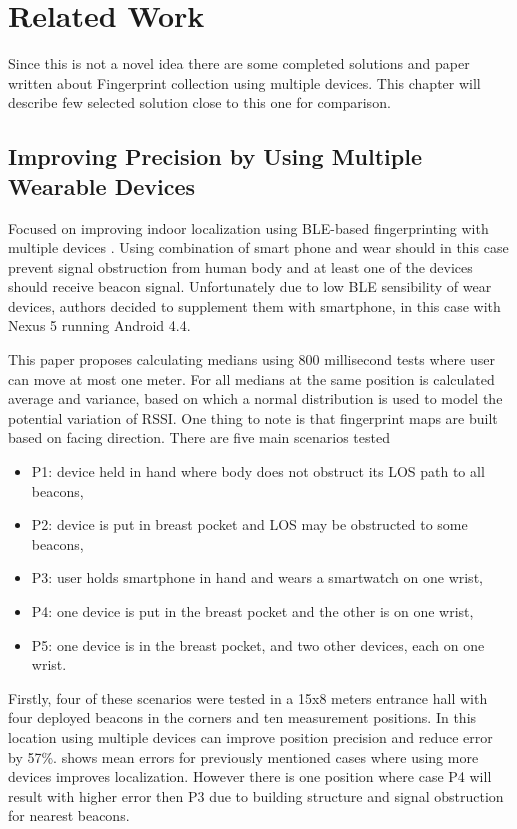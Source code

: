 \chapter{Related Work}\label{sec:RelatedWork}
Since this is not a novel idea there are some completed solutions and paper written about Fingerprint collection using multiple devices. This chapter will describe few selected solution close to this one for comparison.

\section{Improving Precision by Using Multiple Wearable Devices}\label{sec:IPUMWD}
Focused on improving indoor localization using BLE-based fingerprinting with multiple devices \cite{IPBLEIUMWD}. Using combination of smart phone and wear should in this case prevent signal obstruction from human body and at least one of the devices should receive beacon signal. Unfortunately due to low BLE sensibility of wear devices, authors decided to supplement them with smartphone, in this case with Nexus 5 running Android 4.4.

This paper proposes calculating medians using 800 millisecond tests where user can move at most one meter. For all medians at the same position is calculated average and variance, based on which a normal distribution is used to model the potential variation of RSSI. One thing to note is that fingerprint maps are built based on facing direction. There are five main scenarios tested

\begin{itemize}
	\item P1: device held in hand where body does not obstruct its LOS path to all beacons,
	\item P2: device is put in breast pocket and LOS may be obstructed to some beacons,
	\item P3: user holds smartphone in hand and wears a smartwatch on one wrist,
	\item P4: one device is put in the breast pocket and the other is on one wrist,
	\item P5: one device is in the breast pocket, and two other devices, each on one wrist.
\end{itemize} 

Firstly, four of these scenarios were tested in a 15x8 meters entrance hall with four deployed beacons in the corners and ten measurement positions. In this location using multiple devices can improve position precision and reduce error by 57\%.  shows mean errors for previously mentioned cases where using more devices improves localization. However there is one position where case P4 will result with higher error then P3 due to building structure and signal obstruction for nearest beacons.

